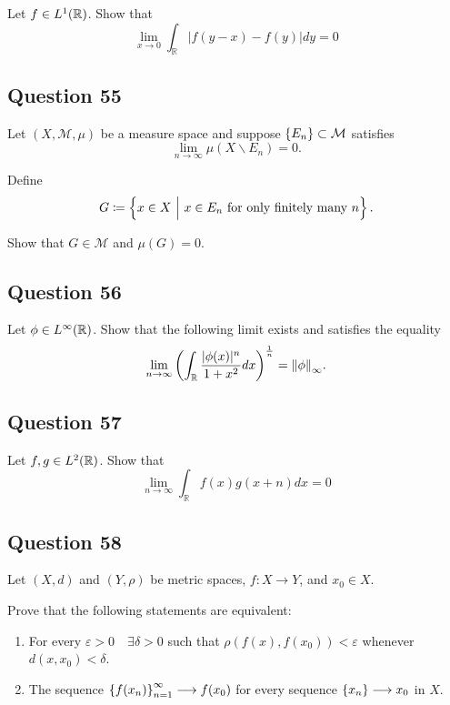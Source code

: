 \documentclass[12pt]{article}
\providecommand{\tightlist}{%
  \setlength{\itemsep}{0pt}\setlength{\parskip}{0pt}}
\begin{document}
Let \(f\in L^1({\mathbb{R}})\). Show that \[
\lim _{x \rightarrow 0} \int_{\mathbb{R}}|f(y-x)-f(y)| d y=0
\]

\hypertarget{question-55-1}{%
\subsection{Question 55}\label{question-55-1}}

Let \((X, \mathcal M, \mu)\) be a measure space and suppose
\(\left\{{E_n}\right\} \subset \mathcal M\) satisfies \[
\lim _{n \rightarrow \infty} \mu\left(X \backslash E_{n}\right)=0.
\]

Define \[
G \coloneqq \left\{{x\in X {~\mathrel{\Big|}~} x\in E_n \text{ for only finitely many  } n}\right\}.
\]

Show that \(G \in \mathcal M\) and \(\mu(G) = 0\).

\hypertarget{question-56-1}{%
\subsection{Question 56}\label{question-56-1}}

Let \(\phi\in L^\infty({\mathbb{R}})\). Show that the following limit exists and
satisfies the equality \[
\lim _{n \rightarrow \infty}\left(\int_{\mathbb{R}} \frac{|\phi(x)|^{n}}{1+x^{2}} d x\right)^{\frac{1}{n}} = {\left\lVert {\phi} \right\rVert}_\infty.
\]

\hypertarget{question-57-1}{%
\subsection{Question 57}\label{question-57-1}}

Let \(f, g \in L^2({\mathbb{R}})\). Show that \[
\lim _{n \rightarrow \infty} \int_{\mathbb{R}} f(x) g(x+n) d x=0
\]

\hypertarget{question-58-1}{%
\subsection{Question 58}\label{question-58-1}}

Let \((X, d)\) and \((Y, \rho)\) be metric spaces, \(f: X\to Y\), and
\(x_0 \in X\).

Prove that the following statements are equivalent:

\begin{enumerate}
\def\labelenumi{\arabic{enumi}.}
\tightlist
\item
  For every \(\varepsilon > 0 \quad \exists \delta > 0\) such that
  \(\rho( f(x), f(x_0) ) < \varepsilon\) whenever
  \(d(x, x_0) < \delta\).
\item
  The sequence \(\left\{{f(x_n)}\right\}_{n=1}^\infty \longrightarrow f(x_0)\) for every
  sequence \(\left\{{x_n}\right\} \longrightarrow x_0\) in \(X\).
\end{enumerate}
\end{document}
